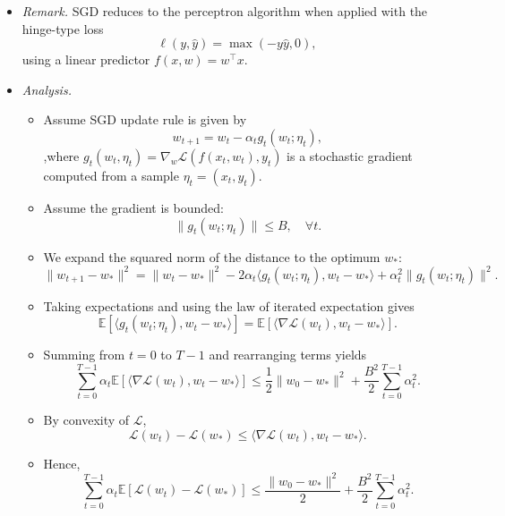 \documentclass[a4paper]{article}
\begin{document}
\begin{itemize}
\begin{itemize}
            \item \textit{Remark.}  
            SGD reduces to the perceptron algorithm when applied with the hinge-type loss  
            \[
                \ell(y, \hat{y}) = \max(-y \hat{y}, 0),
            \]  
            using a linear predictor $f(x, w) = w^\top x$.

            \item \textit{Analysis.}  
                \begin{itemize}
                    \item Assume SGD update rule is given by
                        $$w_{t+1} = w_t - \alpha_t g_t(w_t; \eta_t),$$
            ,where \( g_t(w_t, \eta_t) = \nabla_w \mathcal{L}(f(x_t, w_t), y_t) \) is a stochastic gradient computed from a sample \(\eta_t = (x_t, y_t)\).
                    \item Assume the gradient is bounded:
                        $$\| g_t(w_t; \eta_t) \| \le B, \quad \forall t.$$
                    \item We expand the squared norm of the distance to the optimum \( w_* \):
                        $$ \| w_{t+1} - w_* \|^2
            = \| w_t - w_* \|^2
            - 2 \alpha_t \langle g_t(w_t; \eta_t), w_t - w_* \rangle
            + \alpha_t^2 \| g_t(w_t; \eta_t) \|^2.$$
                    \item Taking expectations and using the law of iterated expectation gives
                        $$\mathbb{E}[\langle g_t(w_t; \eta_t), w_t - w_* \rangle] = \mathbb{E}[\langle \nabla \mathcal{L}(w_t), w_t - w_* \rangle].$$
                    \item Summing from \(t = 0\) to \(T-1\) and rearranging terms yields
                        $$\sum_{t=0}^{T-1} \alpha_t \mathbb{E}[\langle \nabla \mathcal{L}(w_t), w_t - w_* \rangle]
            \le \frac{1}{2}\|w_0 - w_*\|^2 + \frac{B^2}{2}\sum_{t=0}^{T-1}\alpha_t^2.
            $$
                    \item By convexity of \(\mathcal{L}\),
                        $$\mathcal{L}(w_t) - \mathcal{L}(w_*) \le \langle \nabla \mathcal{L}(w_t), w_t - w_* \rangle.$$
                    \item Hence,
                        $$\sum_{t=0}^{T-1} \alpha_t \mathbb{E}[\mathcal{L}(w_t) - \mathcal{L}(w_*)]
            \le \frac{\|w_0 - w_*\|^2}{2} + \frac{B^2}{2}\sum_{t=0}^{T-1}\alpha_t^2.$$



\end{itemize}
\end{itemize}
\end{itemize}
\end{document}
